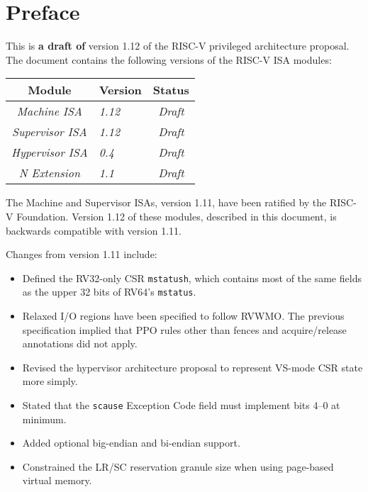 \chapter{Preface}

This is {\bf a draft of} version 1.12 of the RISC-V privileged
architecture proposal.
The document contains the following versions of the RISC-V ISA
modules:

{
\begin{table}[hbt]
  \centering
  \begin{tabular}{|c|l|c|}
    \hline
    Module             & Version  & Status\\
    \hline
    \em Machine ISA    & \em 1.12 & \em Draft \\
    \em Supervisor ISA & \em 1.12 & \em Draft \\
    \em Hypervisor ISA & \em 0.4  & \em Draft \\
    \em N Extension    & \em 1.1 & \em Draft \\
    \hline
  \end{tabular}
\end{table}
}

The Machine and Supervisor ISAs, version 1.11, have been ratified by
the RISC-V Foundation.  Version 1.12 of these modules, described in
this document, is backwards compatible with version 1.11.

Changes from version 1.11 include:
\vspace{-0.2in}
\begin{itemize}
  \parskip 0pt
  \itemsep 1pt
\item Defined the RV32-only CSR {\tt mstatush}, which contains most of the
  same fields as the upper 32 bits of RV64's {\tt mstatus}.
\item Relaxed I/O regions have been specified to follow RVWMO.  The previous
  specification implied that PPO rules other than fences and acquire/release
  annotations did not apply.
\item Revised the hypervisor architecture proposal to represent VS-mode CSR
  state more simply.
\item Stated that the {\tt scause} Exception Code field must implement
  bits 4--0 at minimum.
\item Added optional big-endian and bi-endian support.
\item Constrained the LR/SC reservation granule size when using page-based
  virtual memory.
\end{itemize}

\newpage

